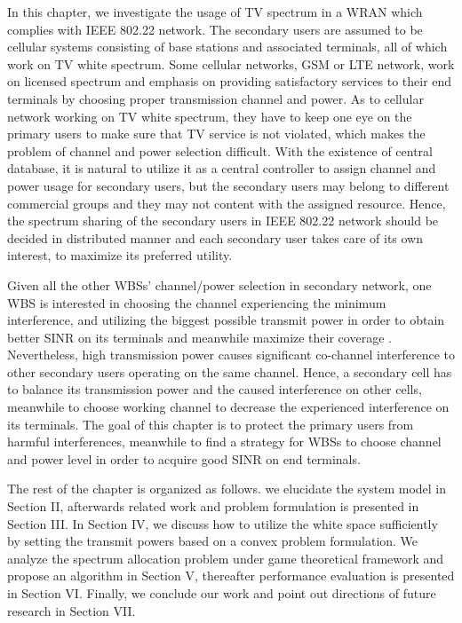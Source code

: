 
In this chapter, we investigate the usage of TV spectrum in a WRAN which complies with IEEE 802.22 network.
The secondary users are assumed to be cellular systems consisting of base stations and associated terminals, all of which work on TV white spectrum. 
Some cellular networks, \ie GSM or LTE network, work on licensed spectrum and emphasis on providing satisfactory services to their end terminals by choosing proper transmission channel and power. 
As to cellular network working on TV white spectrum, they have to keep one eye on the primary users to make sure that TV service is not violated, which makes the problem of channel and power selection difficult.
With the existence of central database, it is natural to utilize it as a central controller to assign channel and power usage for secondary users, but the secondary users may belong to different commercial groups and they may not content with the assigned resource.
Hence, the spectrum sharing of the secondary users in IEEE 802.22 network should be decided in distributed manner and each secondary user takes care of its own interest, \ie to maximize its preferred utility.

Given all the other WBSs' channel/power selection in secondary network, one WBS is interested in choosing the channel experiencing the minimum interference, and utilizing the biggest possible transmit power in order to obtain better SINR on its terminals and meanwhile maximize their coverage \cite{wuinfocom09, HoangPowerChannel2010}. 
Nevertheless, high transmission power causes significant co-channel interference to other secondary users operating on the same channel. 
Hence, a secondary cell has to balance its transmission power and the caused interference on other cells, meanwhile to choose working channel to decrease the experienced interference on its terminals. 
The goal of this chapter is to protect the primary users from harmful interferences, meanwhile to find a strategy for WBSs to choose channel and power level in order to acquire good SINR on end terminals.

The rest of the chapter is organized as follows. we elucidate the system model in Section II, afterwards related work and problem formulation is presented in Section III. In Section IV, we discuss how to utilize the white space sufficiently by setting the transmit powers based on a convex problem formulation. We analyze the spectrum allocation problem under game theoretical framework and propose an algorithm in Section V, thereafter performance evaluation is presented in Section VI. Finally, we conclude our work and point out directions of future research in Section VII.



